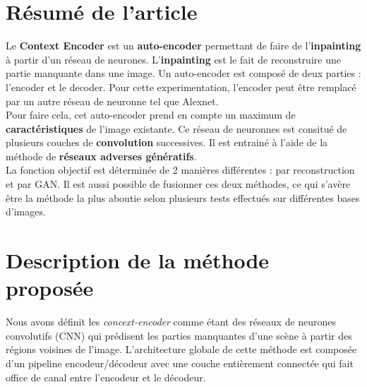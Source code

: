 \documentclass[11pt,a4paper]{article}
\begin{document}
    \section{Résumé de l'article}
    Le \textbf{Context Encoder} est un \textbf{auto-encoder} permettant de faire de l'\textbf{inpainting} à partir d'un réseau de neurones. L'\textbf{inpainting} est le fait de reconstruire une partie manquante dans une image. Un auto-encoder est composé de deux parties : l'encoder et le decoder. Pour cette experimentation, l'encoder peut être remplacé par un autre réseau de neuronne tel que Alexnet.
    \\
    Pour faire cela, cet auto-encoder prend en compte un maximum de \textbf{caractéristiques} de l'image existante. Ce réseau de neuronnes est consitué de plusieurs couches de \textbf{convolution} successives. Il est entrainé à l'aide de la méthode de \textbf{réseaux adverses génératifs}.\\
    La fonction objectif est déterminée de 2 manières différentes : par reconstruction et par GAN. Il est aussi possible de fusionner ces deux méthodes, ce qui s'avère être la méthode la plus aboutie selon plusieurs tests effectués sur différentes bases d'images.
    
    \section{Description de la 	méthode proposée}
    Nous avons définit les \emph{concext-encoder} comme étant des réseaux de neurones convolutifs (CNN) qui prédisent les parties manquantes d’une scène à partir des régions voisines de l’image. L’architecture globale de cette méthode est composée d’un pipeline encodeur/décodeur avec une couche entièrement connectée qui fait office de canal entre l’encodeur et le décodeur.
\end{document}
